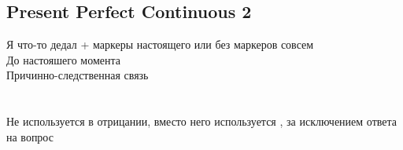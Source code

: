 \subsection{Present Perfect Continuous 2}
\p
Я что-то дедал + маркеры настоящего или без маркеров совсем\\
До настояшего момента\\
Причинно-следственная связь\\
\\\\
Не используется в отрицании, вместо него используется , за исключением ответа на вопрос\\
\\
\\

